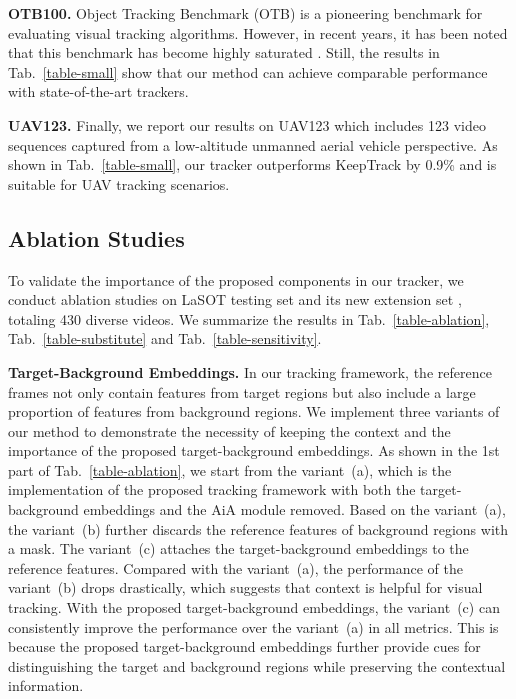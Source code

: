 \noindent\textbf{OTB100.} Object Tracking Benchmark (OTB) \cite{wu2015object} is a pioneering benchmark for evaluating visual tracking algorithms. However, in recent years, it has been noted that this benchmark has become highly saturated \cite{wang2021transformer,yan2021learning,mayer2021learning}. Still, the results in Tab.~\ref{table-small} show that our method can achieve comparable performance with state-of-the-art trackers.

\noindent\textbf{UAV123.} Finally, we report our results on UAV123 \cite{mueller2016benchmark} which includes 123 video sequences captured from a low-altitude unmanned aerial vehicle perspective. As shown in Tab.~\ref{table-small}, our tracker outperforms KeepTrack \cite{mayer2021learning} by 0.9\% and is suitable for UAV tracking scenarios.

\subsection{Ablation Studies}\label{section-ablation}
To validate the importance of the proposed components in our tracker, we conduct ablation studies on LaSOT testing set and its new extension set \cite{fan2021lasot}, totaling 430 diverse videos. We summarize the results in Tab.~\ref{table-ablation}, Tab.~\ref{table-substitute} and Tab.~\ref{table-sensitivity}.

\noindent\textbf{Target-Background Embeddings.} In our tracking framework, the reference frames not only contain features from target regions but also include a large proportion of features from background regions. We implement three variants of our method to demonstrate the necessity of keeping the context and the importance of the proposed target-background embeddings. As shown in the 1st part of Tab.~\ref{table-ablation}, we start from the variant~(a), which is the implementation of the proposed tracking framework with both the target-background embeddings and the AiA module removed. Based on the variant~(a), the variant~(b) further discards the reference features of background regions with a mask. The variant~(c) attaches the target-background embeddings to the reference features. Compared with the variant~(a), the performance of the variant~(b) drops drastically, which suggests that context is helpful for visual tracking. With the proposed target-background embeddings, the variant~(c) can consistently improve the performance over the variant~(a) in all metrics. This is because the proposed target-background embeddings further provide cues for distinguishing the target and background regions while preserving the contextual information.

